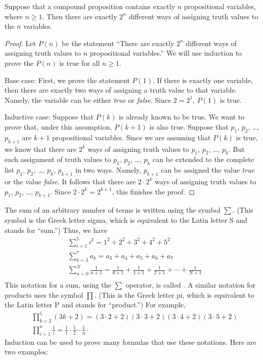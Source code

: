 \begin{theorem}
Suppose that a compound proposition contains exactly $n$ propositional
variables, where $n\ge 1$.  Then there are exactly $2^n$ different ways
of assigning truth values to the $n$ variables.
\end{theorem}
\begin{proof}
Let $P(n)$ be the statement ``There are exactly $2^n$ different ways
of assigning truth values to $n$ propositional variables.''  We will
use induction to prove the $P(n)$ is true for all $n\ge1$.

Base case:  First, we prove the statement $P(1)$.  If there is exactly
one variable, then there are exactly two ways of assigning a truth
value to that variable. Namely, the variable can be either \textit{true}
or \textit{false}.  Since $2=2^1$, $P(1)$ is true.

Inductive case:  Suppose that $P(k)$ is already known to be true.
We want to prove that, under this assumption, $P(k+1)$ is also true.
Suppose that $p_1$, $p_2$, \dots, $p_{k+1}$ are $k+1$ propositional
variables.  Since we are assuming that $P(k)$ is true, we know
that there are $2^k$ ways of assigning truth values to
$p_1$, $p_2$, \dots, $p_k$.  But each assignment of truth values
to $p_1$, $p_2$, \dots, $p_k$ can be extended to the complete
list $p_1$, $p_2$, \dots, $p_k$, $p_{k+1}$ in two ways.  Namely,
$p_{k+1}$ can be assigned the value \textit{true} or the value
\textit{false}.  It follows that there are $2\cdot 2^k$ ways of
assigning truth values to $p_1$, $p_2$, \dots, $p_{k+1}$.
Since $2\cdot2^k=2^{k+1}$, this finishes the proof.
\end{proof}



The sum of an arbitrary number of terms is written using the
symbol $\sum$.  (This symbol is the Greek letter sigma, which is 
equivalent to the Latin letter S and stands for ``sum.'')  Thus, we
have
\begin{align*}
   &\sum_{i=1}^5 i^2 = 1^2+2^2+3^2+4^2+5^2\\
   &\sum_{k=3}^7 a_k = a_3+a_4+a_5+a_6+a_7\\
   &\sum_{n=0}^N \frac{1}{n+1} = \frac{1}{0+1}+\frac{1}{1+1}+\frac{1}{2+1}+\cdots+\frac{1}{N+1}\\
\end{align*}
This notation for a sum, using the $\sum$ operator, is called
.  A similar notation for products uses the
symbol $\prod$.  (This is the Greek letter pi, which is equivalent
to the Latin letter P and stands for ``product.'')  For example,
\begin{align*}
   &\prod_{k=2}^5 (3k+2) = (3\cdot 2+2)(3\cdot 3+2)(3\cdot 4+2)(3\cdot 5+2)\\
   &\prod_{i=1}^n \frac{1}{i} = \frac{1}{1}\cdot \frac{1}{2}\cdots \frac{1}{n}\cdot 
\end{align*}
Induction can be used to prove many formulas that use these notations.
Here are two examples:

